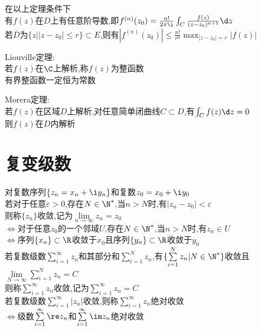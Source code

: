 \begin{tuilun}
在以上定理条件下\\
有$f(z)$在$D$上有任意阶导数,即$f^{(n)}(z_0)=\frac{n!}{2\pi\i}\int_{C}\frac{f(z)}{(z-z_0)^{n+1}}\d z$\\
若$\overline{D}$为$\{z\Big| |z-z_0|\leq r\}\subset E$,则有$|f^{(n)}(z_0)|\leq \frac{n!}{r^n}\max_{|z-z_0|=r}|f(z)|$
\end{tuilun}

\begin{dingli}
Liouville定理:\\
若$f(z)$在$\C$上解析,称$f(z)$为整函数\\
有界整函数一定恒为常数
\end{dingli}

\begin{dingli}
Morera定理:\\
若$f(z)$在区域$D$上解析,对任意简单闭曲线$C\subset D$,有$\int_{C}f(z)\d z=0$\\
则$f(z)$在$D$内解析
\end{dingli}

\chapter{复变级数}

\begin{dingyi}
对复数序列$\{z_n=x_n+\i y_n\}$和复数$z_0=x_0+\i y_0$\\
若对于任意$\varepsilon>0$,存在$N\in \N^*$,当$n>N$时,有$|z_n-z_0|<\varepsilon$\\
则称$\{z_n\}$收敛,记为$\lim\limits_{n\to \infty}z_n=z_0$\\
$\Leftrightarrow$对于任意$z_0$的一个邻域$U$,存在$N\in \N^*$,当$n>N$时,有$z_n\in U$\\
$\Leftrightarrow$序列$\{x_n\}\subset \R$收敛于$x_0$且序列$\{y_n\}\subset \R$收敛于$y_0$\\
若复数级数$\sum\limits_{i=1}^{\infty}z_n$和其部分和$\sum\limits_{i=1}^{N}z_n$,有$\{\sum\limits_{i=1}^{N}z_n|N\in \N^*\}$收敛且$\lim\limits_{N\to \infty}\sum\limits_{i=1}^{N}z_n=C$\\
则称$\sum\limits_{i=1}^{\infty}z_n$收敛,记为$\sum\limits_{i=1}^{\infty}z_n=C$\\
若复数级数$\sum\limits_{i=1}^{\infty}|z_n|$收敛,则称$\sum\limits_{i=1}^{\infty}z_n$绝对收敛\\
$\Leftrightarrow$级数$\sum\limits_{i=1}^{\infty}\re z_n$和$\sum\limits_{i=1}^{\infty}\im z_n$绝对收敛
\end{dingyi}

